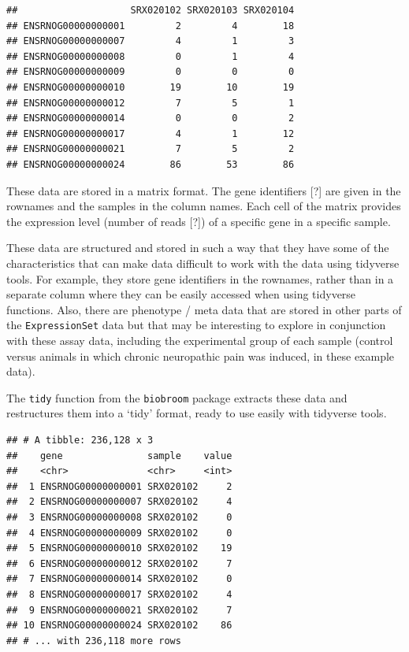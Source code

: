 \documentclass[]{tufte-book}
\begin{document}
\begin{verbatim}
##                    SRX020102 SRX020103 SRX020104
## ENSRNOG00000000001         2         4        18
## ENSRNOG00000000007         4         1         3
## ENSRNOG00000000008         0         1         4
## ENSRNOG00000000009         0         0         0
## ENSRNOG00000000010        19        10        19
## ENSRNOG00000000012         7         5         1
## ENSRNOG00000000014         0         0         2
## ENSRNOG00000000017         4         1        12
## ENSRNOG00000000021         7         5         2
## ENSRNOG00000000024        86        53        86
\end{verbatim}

These data are stored in a matrix format. The gene identifiers {[}?{]} are given in
the rownames and the samples in the column names. Each cell of the matrix
provides the expression level (number of reads {[}?{]}) of a specific gene in a
specific sample.

These data are structured and stored in such a way that they have some of the
characteristics that can make data difficult to work with the data using
tidyverse tools. For example, they store gene identifiers in the rownames,
rather than in a separate column where they can be easily accessed when using
tidyverse functions. Also, there are phenotype / meta data that are stored
in other parts of the \texttt{ExpressionSet} data but that may be interesting to
explore in conjunction with these assay data, including the experimental
group of each sample (control versus animals in which chronic neuropathic
pain was induced, in these example data).

The \texttt{tidy} function from the \texttt{biobroom} package extracts these data and
restructures them into a `tidy' format, ready to use easily with tidyverse
tools.

\begin{verbatim}
## # A tibble: 236,128 x 3
##    gene               sample    value
##    <chr>              <chr>     <int>
##  1 ENSRNOG00000000001 SRX020102     2
##  2 ENSRNOG00000000007 SRX020102     4
##  3 ENSRNOG00000000008 SRX020102     0
##  4 ENSRNOG00000000009 SRX020102     0
##  5 ENSRNOG00000000010 SRX020102    19
##  6 ENSRNOG00000000012 SRX020102     7
##  7 ENSRNOG00000000014 SRX020102     0
##  8 ENSRNOG00000000017 SRX020102     4
##  9 ENSRNOG00000000021 SRX020102     7
## 10 ENSRNOG00000000024 SRX020102    86
## # ... with 236,118 more rows
\end{verbatim}
\end{document}
